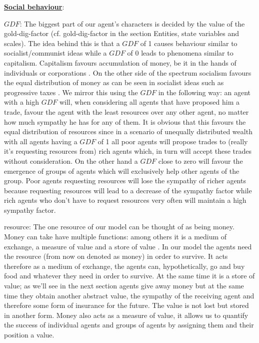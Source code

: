 \documentclass{JASSS}
\newcommand{\gdf}{\mathit{GDF}}
\begin{document}
	\textbf{\underline{Social behaviour}}:
	\begin{description*}
		\item[$\boldsymbol{\gdf}$:]
			The biggest part of our agent's characters is decided by the value of the gold-dig-factor (cf. gold-dig-factor in the section Entities, state variables and scales). The idea behind this is that a $\gdf$ of 1 causes behaviour similar to socialist/communist ideas while a $\gdf$ of 0 leads to phenomena similar to capitalism. Capitalism favours accumulation of money, be it in the hands of individuals or corporations \citep{marx}. On the other side of the spectrum socialism favours the equal distribution of money as can be seen in socialist ideas such as progressive taxes \citep{moyes}. We mirror this using the $\gdf$ in the following way: an agent with a high $\gdf$ will, when considering all agents that have proposed him a trade, favour the agent with the least resources over any other agent, no matter how much sympathy he has for any of them. It is obvious that this favours the equal distribution of resources since in a scenario of unequally distributed wealth with all agents having a $\gdf$ of 1 all poor agents will propose trades to (really it's requesting resources from) rich agents which, in turn will accept these trades without consideration. On the other hand a $\gdf$ close to zero will favour the emergence of groups of agents which will exclusively help other agents of the group. Poor agents requesting resources will lose the sympathy of richer agents because requesting resources will lead to a decrease of the sympathy factor while rich agents who don't have to request resources very often will maintain a high sympathy factor.
			
		\item[resource:]
			The one resource of our model can be thought of as being money. Money can take have multiple functions: among others it is a medium of exchange, a measure of value and a store of value \citep{jevons}. In our model the agents need the resource (from now on denoted as money) in order to survive. It acts therefore as a medium of exchange, the agents can, hypothetically, go and buy food and whatever they need in order to survive. At the same time it is a store of value; as we'll see in the next section agents give away money but at the same time they obtain another abstract value, the sympathy of the receiving agent and therefore some form of insurance for the future. The value is not lost but stored in another form. Money also acts as a measure of value, it allows us to quantify the success of individual agents and groups of agents by assigning them and their position a value.
			

\end{description*}
\end{document}
